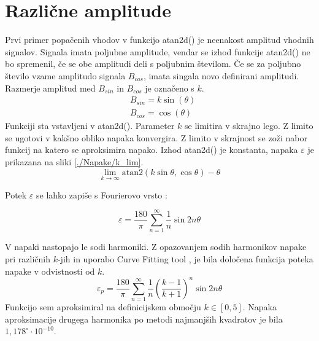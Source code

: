 \section{Različne amplitude}
Prvi primer popačenih vhodov v funkcijo atan2d() je neenakost amplitud vhodnih signalov. Signala imata poljubne amplitude, vendar se izhod funkcije atan2d() ne bo spremenil, če se obe amplitudi deli s
poljubnim številom. Če se za poljubno število vzame amplitudo signala $B_{cos}$, imata singala novo definirani amplitudi. Razmerje amplitud med $B_{sin}$ in $B_{cos}$ je označeno s $k$.
\begin{eqnarray}
\label{equ:def_sin_ama}
&B_{sin} = k \sin(\theta)\\
\label{equ:def_cos_amp}
&B_{cos} =\cos(\theta)
\end{eqnarray}
Funkciji sta vstavljeni v atan2d(). Parameter $k$ se limitira v skrajno lego. Z limito se ugotovi v kakšno obliko napaka konvergira. Z limito v skrajnost se zoži nabor funkcij na katero se aproksimira napako.  Izhod atan2d() je konstanta, napaka $\varepsilon$ je prikazana na sliki \ref{./Napake/k_lim}.
\begin{equation}
\lim_{k \rightarrow \infty} \mathrm{atan2}(k \sin{\theta},\cos{\theta}) - \theta
\end{equation}

Potek $\varepsilon$ se lahko zapiše s Fourierovo vrsto \cite{Matematika1}:

\begin{equation}
\varepsilon = \frac{180}{\pi}\sum_{n=1}^{\infty}\frac{1}{n} \sin 2 n \theta
\end{equation}

V napaki nastopajo le sodi harmoniki. Z opazovanjem sodih harmonikov napake pri različnih $k$-jih in uporabo Curve Fitting tool \cite{cftool}, je bila določena funkcija poteka napake v odvistnosti od $k$.
\begin{equation}
\label{vrsta_k}
\varepsilon_p =\frac{180}{\pi}\sum_{n=1}^{\infty}\frac{1}{n}(\frac{k-1}{k+1})^n \sin 2 n \theta
\end{equation}
Funkcijo sem aproksimiral na definicijskem območju $k \in [ 0, 5]$. Napaka aproksimacije drugega harmonika po metodi najmanjših kvadratov je bila
 $1,178^\circ\cdot 10^{-10}$.

